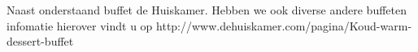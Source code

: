Naast onderstaand buffet de Huiskamer. Hebben we ook diverse andere buffeten infomatie hierover vindt u op http://www.dehuiskamer.com/pagina/Koud-warm-dessert-buffet

